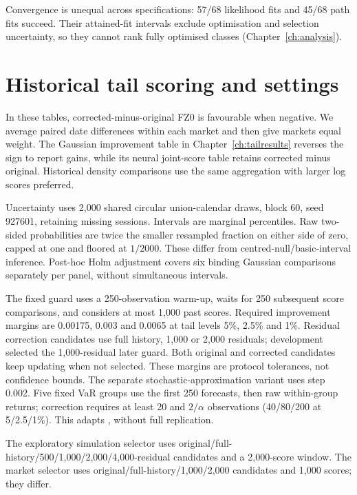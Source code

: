 Convergence is unequal across specifications: 57/68 likelihood fits and 45/68 path fits succeed. Their attained-fit intervals exclude optimisation and selection uncertainty, so they cannot rank fully optimised classes (Chapter~\ref{ch:analysis}).

\section{Historical tail scoring and settings}
\label{sec:tail-score-details}

In these tables, corrected-minus-original FZ0 is favourable when negative. We average paired date differences within each market and then give markets equal weight. The Gaussian improvement table in Chapter~\ref{ch:tailresults} reverses the sign to report gains, while its neural joint-score table retains corrected minus original. Historical density comparisons use the same aggregation with larger log scores preferred.

Uncertainty uses 2,000 shared circular union-calendar draws, block 60, seed 927601, retaining missing sessions. Intervals are marginal percentiles. Raw two-sided probabilities are twice the smaller resampled fraction on either side of zero, capped at one and floored at $1/2000$. These differ from centred-null/basic-interval inference. Post-hoc Holm adjustment covers six binding Gaussian comparisons separately per panel, without simultaneous intervals.

The fixed guard uses a 250-observation warm-up, waits for 250 subsequent score comparisons, and considers at most 1,000 past scores. Required improvement margins are 0.00175, 0.003 and 0.0065 at tail levels 5\%, 2.5\% and 1\%. Residual correction candidates use full history, 1,000 or 2,000 residuals; development selected the 1,000-residual later guard. Both original and corrected candidates keep updating when not selected. These margins are protocol tolerances, not confidence bounds. The separate stochastic-approximation variant uses step 0.002. Five fixed VaR groups use the first 250 forecasts, then raw within-group returns; correction requires at least 20 and $2/\alpha$ observations (40/80/200 at 5/2.5/1\%). This adapts \citet{foster2023calibeating}, without full replication.

The exploratory simulation selector uses original/full-history/500/1,000/2,000/4,000-residual candidates and a 2,000-score window. The market selector uses original/full-history/1,000/2,000 candidates and 1,000 scores; they differ.


